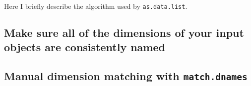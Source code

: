 \documentclass{article}
\newcommand{\code}[1]{\texttt{#1}}
\numberwithin{exercise}{section}
\begin{document}
\noindent Here I briefly describe the algorithm used by \code{as.data.list}.



\subsection{Make sure all of the dimensions of your input objects are consistently named}



\subsection{Manual dimension matching with \code{match.dnames}} 

\end{document}

